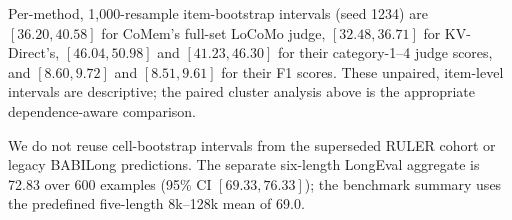 Per-method, 1,000-resample item-bootstrap intervals (seed 1234) are
$[36.20,40.58]$ for CoMem's full-set LoCoMo judge, $[32.48,36.71]$ for
KV-Direct's, $[46.04,50.98]$ and $[41.23,46.30]$ for their category-1--4 judge
scores, and $[8.60,9.72]$ and $[8.51,9.61]$ for their F1 scores. These unpaired,
item-level intervals are descriptive; the paired cluster analysis above is the
appropriate dependence-aware comparison.

We do not reuse cell-bootstrap intervals from the superseded RULER cohort or
legacy BABILong predictions. The separate six-length LongEval aggregate is
72.83 over 600 examples (95\% CI $[69.33,76.33]$); the benchmark summary
uses the predefined five-length 8k--128k mean of 69.0.
